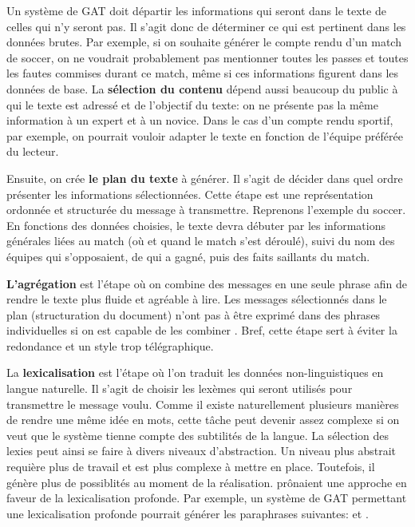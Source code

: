 Un système de \ac{GAT} doit départir les informations qui seront dans le texte de celles qui n'y seront pas. Il s'agit donc de déterminer ce qui est pertinent dans les données brutes. Par exemple, si on souhaite générer le compte rendu d'un match de soccer, on ne voudrait probablement pas mentionner toutes les passes et toutes les fautes commises durant ce match, même si ces informations figurent dans les données de base. La \textbf{sélection du contenu} dépend aussi beaucoup du public à qui le texte est adressé et de l'objectif du texte: on ne présente pas la même information à un expert et à un novice. Dans le cas d'un compte rendu sportif, par exemple, on pourrait vouloir adapter le texte en fonction de l'équipe préférée du lecteur.

Ensuite, on crée \textbf{le plan du texte} à générer. Il s'agit de décider dans quel ordre présenter les informations sélectionnées. Cette étape est une représentation ordonnée et structurée du message à transmettre. Reprenons l'exemple du soccer. En fonctions des données choisies, le texte devra débuter par les informations générales liées au match (où et quand le match s'est déroulé), suivi du nom des équipes qui s'opposaient, de qui a gagné, puis des faits saillants du match.

\textbf{L'agrégation} est l'étape où on combine des messages en une seule phrase afin de rendre le texte plus fluide et agréable à lire. Les messages sélectionnés dans le plan (structuration du document) n'ont pas à être exprimé dans des phrases individuelles si on est capable de les combiner \citep{ChengCapturingInteractionAggregation2000}. Bref, cette étape sert à éviter la redondance et un style trop télégraphique.

La \textbf{lexicalisation} est l'étape où l'on traduit les données non-linguistiques en langue naturelle. Il s'agit de choisir les lexèmes qui seront utilisés pour transmettre le message voulu. Comme il existe naturellement plusieurs manières de rendre une même idée en mots, cette tâche peut devenir assez complexe si on veut que le système tienne compte des subtilités de la langue. La sélection des lexies peut ainsi se faire à divers niveaux d'abstraction. Un niveau plus abstrait requière plus de travail et est plus complexe à mettre en place. Toutefois, il génère plus de possiblités au moment de la réalisation. \cite{ElhadadFloatingConstraintsLexical1997} prônaient une approche en faveur de la lexicalisation profonde. Par exemple, un système de \ac{GAT} permettant une lexicalisation profonde pourrait générer les paraphrases suivantes:  et .

